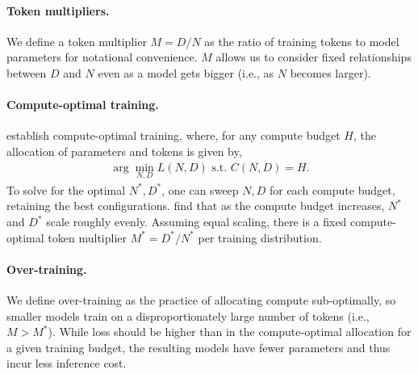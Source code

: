 \paragraph{Token multipliers.} We define a token multiplier $M=D/N$ as the ratio of training tokens to model parameters for notational convenience. $M$ allows us to consider fixed relationships between $D$ and $N$ even as a model gets bigger (i.e., as $N$ becomes larger).

\paragraph{Compute-optimal training.}
\citet{chinchilla} establish compute-optimal training, where, for any compute budget $H$, the allocation of parameters and tokens is given by,
\begin{align}
\label{eq:opti}
\arg\min_{N, D} L(N, D) \text{ s.t. } C(N,D) = H.
\end{align}
To solve for the optimal $N^*, D^*$, one can sweep $N,D$ for each compute budget, retaining the best configurations.
\citet{chinchilla} find that as the compute budget increases, $N^*$ and $D^*$ scale roughly evenly.
Assuming equal scaling, there is a fixed compute-optimal token multiplier $M^* = D^* / N^*$ per training distribution.

\paragraph{Over-training.}
We define over-training as the practice of allocating compute sub-optimally, so smaller models train on a disproportionately large number of tokens (i.e., $M > M^*$).
While loss should be higher than in the compute-optimal allocation for a given training budget, the resulting models have fewer parameters and thus incur less inference cost.


